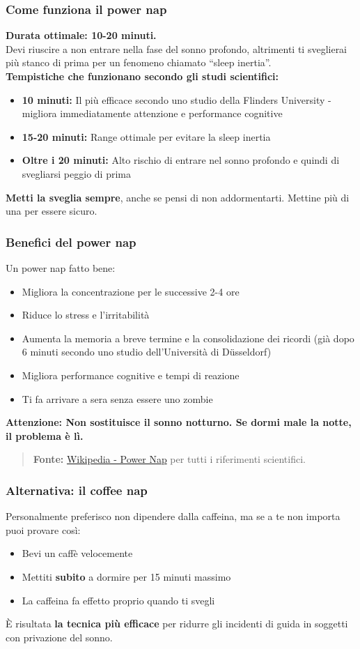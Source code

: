 \documentclass[18pt]{extarticle}
\begin{document}
\subsubsection{Come funziona il power nap}
\textbf{Durata ottimale: 10-20 minuti.}\\
Devi riuscire a non entrare nella fase del sonno profondo, altrimenti ti sveglierai più stanco di prima per un fenomeno chiamato ``sleep inertia''.\\
\textbf{Tempistiche che funzionano secondo gli studi scientifici:}
\begin{itemize}
\item \textbf{10 minuti:} Il più efficace secondo uno studio della Flinders University - migliora immediatamente attenzione e performance cognitive
\item \textbf{15-20 minuti:} Range ottimale per evitare la sleep inertia
\item \textbf{Oltre i 20 minuti:} Alto rischio di entrare nel sonno profondo e quindi di svegliarsi peggio di prima
\end{itemize}%
\textbf{Metti la sveglia sempre}, anche se pensi di non addormentarti. Mettine più di una per essere sicuro.


\subsubsection{Benefici del power nap}
Un power nap fatto bene:
\begin{itemize}
\item Migliora la concentrazione per le successive 2-4 ore
\item Riduce lo stress e l'irritabilità
\item Aumenta la memoria a breve termine e la consolidazione dei ricordi (già dopo 6 minuti secondo uno studio dell'Università di Düsseldorf)
\item Migliora performance cognitive e tempi di reazione
\item Ti fa arrivare a sera senza essere uno zombie
\end{itemize}
\textbf{Attenzione: Non sostituisce il sonno notturno. Se dormi male la notte, il problema è lì.}
\begin{quote}
\textbf{Fonte:} \href{https://en.wikipedia.org/wiki/Power_nap}{Wikipedia - Power Nap} per tutti i riferimenti scientifici.
\end{quote}


\subsubsection{Alternativa: il coffee nap}
Personalmente preferisco non dipendere dalla caffeina, ma se a te non importa puoi provare così:
\begin{itemize}
\item Bevi un caffè velocemente
\item Mettiti \textbf{subito} a dormire per 15 minuti massimo
\item La caffeina fa effetto proprio quando ti svegli
\end{itemize}
È risultata \textbf{la tecnica più efficace} per ridurre gli incidenti di guida in soggetti con privazione del sonno.
\end{document}
